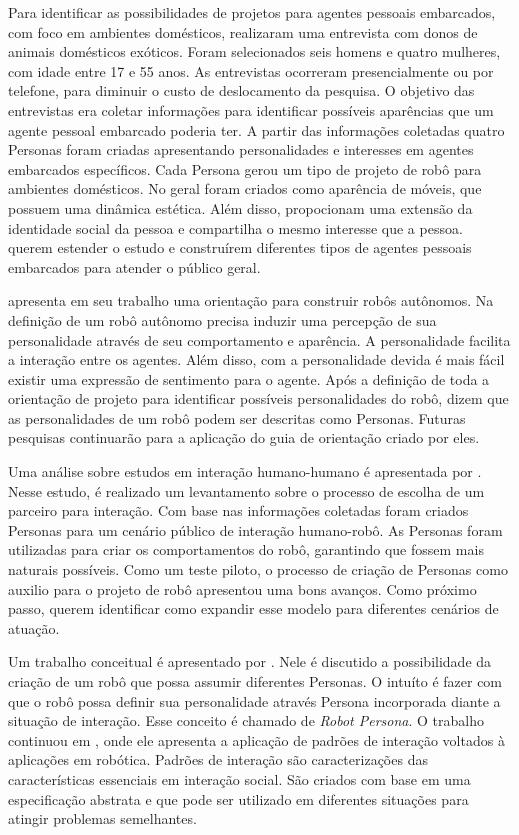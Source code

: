 Para identificar as possibilidades de projetos para agentes pessoais embarcados, com foco em ambientes domésticos, \textcite{ljungblad:2006} realizaram uma entrevista com donos de animais domésticos exóticos. Foram selecionados seis homens e quatro mulheres, com idade entre 17 e 55 anos. As entrevistas ocorreram presencialmente ou por telefone, para diminuir o custo de deslocamento da pesquisa. O objetivo das entrevistas era coletar informações para identificar possíveis aparências que um agente pessoal embarcado poderia ter. A partir das informações coletadas quatro Personas foram criadas apresentando personalidades e interesses em agentes embarcados específicos. Cada Persona gerou um tipo de projeto de robô para ambientes domésticos. No geral foram criados como aparência de móveis, que possuem uma dinâmica estética. Além disso, propocionam uma extensão da identidade social da pessoa e compartilha o mesmo interesse que a pessoa. \textcite{ljungblad:2006} querem estender o estudo e construírem diferentes tipos de agentes pessoais embarcados para atender o público geral.

\textcite{meerbeek:2009} apresenta em seu trabalho uma orientação para construir robôs autônomos. Na definição de \textcite{meerbeek:2009} um robô autônomo precisa induzir uma percepção de sua personalidade através de seu comportamento e aparência. A personalidade facilita a interação entre os agentes. Além disso, com a personalidade devida é mais fácil existir uma expressão de sentimento para o agente. Após a definição de toda a orientação de projeto para identificar possíveis personalidades do robô, \textcite{meerbeek:2009} dizem que as personalidades de um robô podem ser descritas como Personas. Futuras pesquisas continuarão para a aplicação do guia de orientação criado por eles.

Uma análise sobre estudos em interação humano-humano é apresentada por \textcite{zlotowski:2011}. Nesse estudo, é realizado um levantamento sobre o processo de escolha de um parceiro para interação. Com base nas informações coletadas foram criados Personas para um cenário público de interação humano-robô. As Personas foram utilizadas para criar os comportamentos do robô, garantindo que fossem mais naturais possíveis. Como um teste piloto, o processo de criação de Personas como auxilio para o projeto de robô apresentou uma bons avanços. Como próximo passo, \textcite{zlotowski:2011} querem identificar como expandir esse modelo para diferentes cenários de atuação.

Um trabalho conceitual é apresentado por \textcite{ruckert:2011}. Nele é discutido a possibilidade da criação de um robô que possa assumir diferentes Personas. O intuíto é fazer com que o robô possa definir sua personalidade através Persona incorporada diante a situação de interação. Esse conceito é chamado de \emph{Robot Persona}. O trabalho continuou em \textcite{ruckert:2013}, onde ele apresenta a aplicação de padrões de interação voltados à aplicações em robótica. Padrões de interação são caracterizações das características essenciais em interação social. São criados com base em uma especificação abstrata e que pode ser utilizado em diferentes situações para atingir problemas semelhantes.

